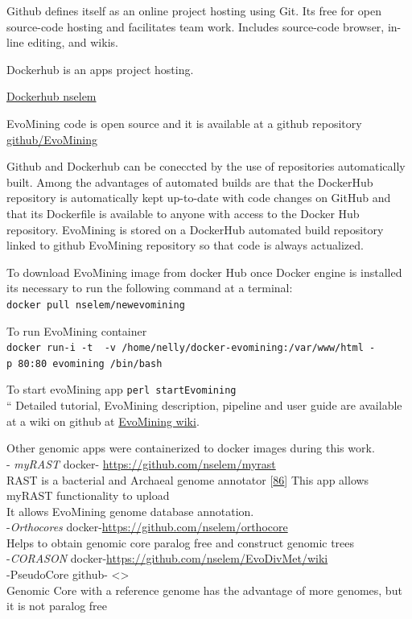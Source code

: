 \documentclass[12pt,twoside]{reedthesis}
\begin{document}
  Github defines itself as an online project hosting using Git. Its free
  for open source-code hosting and facilitates team work. Includes
  source-code browser, in-line editing, and wikis.
  
  Dockerhub is an apps project hosting.
  
  \href{https://hub.docker.com/u/nselem/}{Dockerhub nselem}
  
  EvoMining code is open source and it is available at a github repository
  \href{https://github.com/nselem/EvoMining}{github/EvoMining}
  
  Github and Dockerhub can be coneccted by the use of repositories
  automatically built. Among the advantages of automated builds are that
  the DockerHub repository is automatically kept up-to-date with code
  changes on GitHub and that its Dockerfile is available to anyone with
  access to the Docker Hub repository. EvoMining is stored on a DockerHub
  automated build repository linked to github EvoMining repository so that
  code is always actualized.
  
  To download EvoMining image from docker Hub once Docker engine is
  installed its necessary to run the following command at a terminal:\\
  \texttt{docker\ pull\ nselem/newevomining}
  
  To run EvoMining container\\
  \texttt{docker\ run-i\ -t\ \ -v\ /home/nelly/docker-evomining:/var/www/html\ -p\ 80:80\ evomining\ /bin/bash}
  
  To start evoMining app \texttt{perl\ startEvomining}\\
  `` Detailed tutorial, EvoMining description, pipeline and user guide are
  available at a wiki on github at
  \href{https://github.com/nselem/EvoMining/wiki}{EvoMining wiki}.
  
  Other genomic apps were containerized to docker images during this
  work.\\
  - \emph{myRAST} docker- \url{https://github.com/nselem/myrast}\\
  RAST is a bacterial and Archaeal genome annotator
  {[}\protect\hyperlink{ref-aziz_rast_2008}{86}{]} This app allows myRAST
  functionality to upload\\
  It allows EvoMining genome database annotation.\\
  -\emph{Orthocores} docker-\url{https://github.com/nselem/orthocore}\\
  Helps to obtain genomic core paralog free and construct genomic trees\\
  -\emph{CORASON} docker-\url{https://github.com/nselem/EvoDivMet/wiki}\\
  -PseudoCore github- \textless{}\textgreater{}\\
  Genomic Core with a reference genome has the advantage of more genomes,
  but it is not paralog free
  
\end{document}
